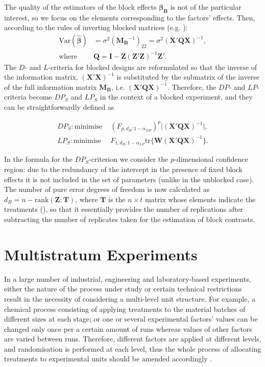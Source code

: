 The quality of the estimators of the block effects $\bm{\beta_B}$ is not of the particular interest, so we focus on the elements corresponding to the factors' effects. Then, according to the rules of inverting blocked matrices (e.g. \citealp{Harville2006matrix}):
\begin{align*}
\mbox{Var}(\hat{\bm{\beta}})&=\sigma^2(\bm{M_B}^{-1})_{22}=\sigma^2(\bm{X}'\bm{QX})^{-1},\\
\mbox{where }&\bm{Q}=\bm{I}-\bm{Z}(\bm{Z}'\bm{Z})^{-1}\bm{Z}'.
\end{align*}
The $D$- and $L$-criteria for blocked designs are reformulated so that the inverse of the information matrix, $(\bm{X}'\bm{X})^{-1}$ is substituted by the submatrix of the inverse of the full information matrix $\bm{M_B}$, i.e. $(\bm{X}'\bm{QX})^{-1}.$ Therefore, the $DP$- and $LP$-criteria become $DP_S$ and $LP_S$ in the context of a blocked experiment, and they can be straightforwardly defined as

\begin{align}
\label{eq::DPs_blocked}
DP_S: \mbox{minimise } &(F_{p,d_B;1-\alpha_{DP}})^{p}\vert (\bm{X}'\bm{Q}\bm{X})^{-1}\vert,\\
\label{eq::LPs_blocked}
LP_S: \mbox{minimise } &F_{1,d_B;1-\alpha_{LP}}\mbox{tr}\{\bm{W}(\bm{X}'\bm{Q}\bm{X})^{-1}\}.
\end{align}

In the formula for the $DP_S$-criterion we consider the $p$-dimensional confidence region: due to the redundancy of the intercept in the presence of fixed block effects it is not included in the set of parameters (unlike in the unblocked case). The number of pure error degrees of freedom is now calculated as $d_B=n-\mbox{rank}(\bm{Z}:\bm{T})$, where $\bm{T}$ is the $n\times t$ matrix whose elements indicate the treatments (\citealp{GilmourTrinca2012}), so that it essentially provides the number of replications after subtracting the number of replicates taken for the estimation of block contrasts.  


\section{Multistratum Experiments}
\label{sec::back_ms}
In a large number of industrial, engineering and laboratory-based experiments, either the nature of the process under study or certain technical restrictions result in the necessity of considering a multi-level unit structure. For example, a chemical process consisting of applying treatments to the material batches of different sizes at each stage;  or one or several experimental factors' values can be changed only once per a certain amount of runs whereas values of other factors are varied between runs. Therefore, different factors are applied at different levels, and randomisation is performed at each level, thus the whole process of allocating treatments to experimental units should be amended accordingly \citep{MeadGilmour2012}.

